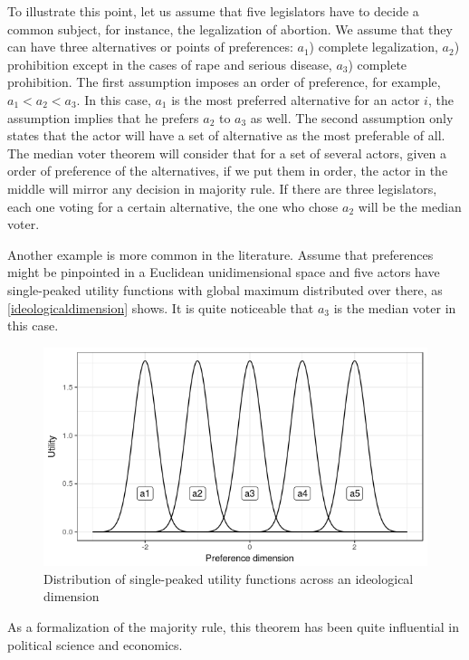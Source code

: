 \documentclass[12pt, a4paper]{article}
\begin{document}
To illustrate this point, let us assume that five legislators have to 
decide a common subject, for instance, the legalization of abortion. 
We assume that they can have three alternatives or points 
of preferences: $a_1$) complete legalization, $a_2$) prohibition 
except in the cases of rape and serious disease, $a_3$) 
complete prohibition. The first assumption imposes 
an order of preference, for example, $a_1 < a_2 < a_3$. 
In this case, $a_1$ is the most preferred alternative 
for an actor $i$, the assumption implies that he prefers
$a_2$ to $a_3$ as well. The second assumption only states 
that the actor will have a set of alternative as the most 
preferable of all. The median voter theorem will consider 
that for a set of several actors, given a order of 
preference of the alternatives, if we put them in order, 
the actor in the middle will mirror any decision in majority rule. 
If there are three legislators, each one voting for a certain alternative, 
the one who chose $a_2$ will be the median voter.

Another example is more common in the literature. 
Assume that preferences might be pinpointed in a 
Euclidean unidimensional space and five actors have single-peaked 
utility functions with global maximum distributed over there, 
as  \autoref{ideologicaldimension} shows. 
It is quite noticeable that $a_3$ is the median voter in this case.

\begin{figure}[htb]
\label{ideologicaldimension}
\caption{Distribution of single-peaked utility functions across an ideological dimension}
\includegraphics[scale=1]{figure_dimensions.png}
\centering
\end{figure}

As a formalization of the majority rule, this theorem has been quite 
influential in political science and economics. 
\end{document}
